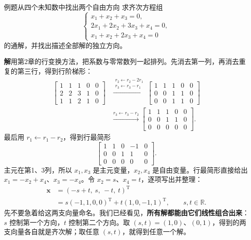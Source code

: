 \documentclass[a4paper,12pt,twoside,openany,fontset=none]{ctexbook}
\newcounter{example}[chapter]
\newenvironment{example}[1][]{\begin{exBox}{例题}{#1}}{\end{exBox}}
\numberwithin{equation}{chapter}
\begin{document}
\begin{example}[从四个未知数中找出两个自由方向]
求齐次方程组
\begin{equation}
 \begin{cases}
 x_1+x_2+x_3=0,\\
 2x_1+2x_2+3x_3+x_4=0,\\
 x_1+x_2+2x_3+x_4=0
 \end{cases}
 \label{eq:five-four-variable-system}
\end{equation}
的通解，并找出描述全部解的独立方向。
\end{example}
\textbf{解}\quad 用第2章的行变换方法，把系数与零常数列一起排列。先消去第一列，再消去重复的第三行，得到行阶梯形：
\begin{align}
 \left[\begin{array}{rrrr|r}
 1&1&1&0&0\\2&2&3&1&0\\1&1&2&1&0
 \end{array}\right]
 &\xrightarrow{\substack{r_2\leftarrow r_2-2r_1\\r_3\leftarrow r_3-r_1}}
 \left[\begin{array}{rrrr|r}
 1&1&1&0&0\\0&0&1&1&0\\0&0&1&1&0
 \end{array}\right]\\
 &\xrightarrow{r_3\leftarrow r_3-r_2}
 \left[\begin{array}{rrrr|r}
 1&1&1&0&0\\0&0&1&1&0\\0&0&0&0&0
 \end{array}\right].
\end{align}
最后用 $r_1\leftarrow r_1-r_2$，得到行最简形
\begin{equation}
 \left[\begin{array}{rrrr|r}
 1&1&0&-1&0\\0&0&1&1&0\\0&0&0&0&0
 \end{array}\right].
 \label{eq:five-four-variable-rref}
\end{equation}
主元在第1、3列，所以 $x_1,x_3$ 是主元变量，$x_2,x_4$ 是自由变量。行最简形直接给出 $x_1=-x_2+x_4$、$x_3=-x_4$。令 $x_2=s$、$x_4=t$，逐项写出并整理：
\begin{align}
 \boldsymbol x
 &=(-s+t,\ s,\ -t,\ t)^{\mathrm T}\\
 &=s(-1,1,0,0)^{\mathrm T}+t(1,0,-1,1)^{\mathrm T},
 \qquad s,t\in\mathbb R.
 \label{eq:five-four-variable-general}
\end{align}
先不要急着给这两支向量命名。我们已经看见，\textbf{所有解都能由它们线性组合出来}：$s$ 控制第一个方向，$t$ 控制第二个方向。取 $(s,t)=(1,0)$、$(0,1)$，得到的两支向量各自就是齐次解；取任意 $(s,t)$，就得到任意一个解。
\end{document}
